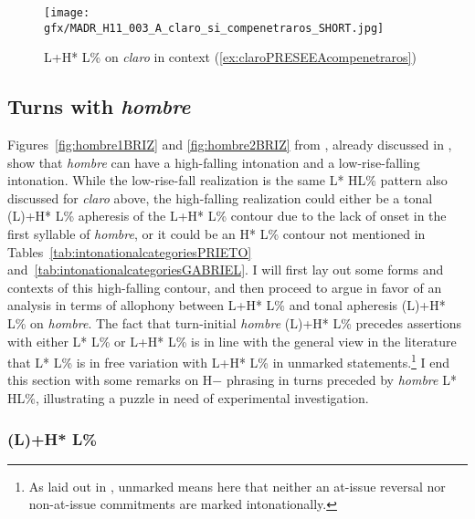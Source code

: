 \begin{figure}
	\texttt{[image: gfx/MADR\_H11\_003\_A\_claro\_si\_compenetraros\_SHORT.jpg]}
	\caption[L+H* L\% on \textit{claro} in context (\ref{ex:claroPRESEEAcompenetraros})]{L+H* L\% on \textit{claro} in context (\ref{ex:claroPRESEEAcompenetraros}) \href{https://osf.io/2q7ht/}{\faVolumeUp} \label{fig:claroPRESEEAcompenetraros}}
\end{figure}


\subsection{Turns with \textit{hombre}}
\label{ch:5.2.2}

Figures~\ref{fig:hombre1BRIZ} and \ref{fig:hombre2BRIZ} from \citet{Briz.2012}, already discussed in , show that \textit{hombre} can have a high-falling intonation and a low-rise-falling intonation. While the low-rise-fall realization is the same L* HL\% pattern also discussed for \textit{claro} above, the high-falling realization could either be a tonal (L)+H* L\% aphe\-re\-sis of the L+H* L\% contour due to the lack of onset in the first syllable of \textit{hombre}, or it could be an H* L\% contour not mentioned in Tables~\ref{tab:intonationalcategoriesPRIETO} and~\ref{tab:intonationalcategoriesGABRIEL}. I will first lay out some forms and contexts of this high-falling contour, and then proceed to argue in favor of an analysis in terms of allophony between L+H* L\% and tonal apheresis (L)+H* L\% on \textit{hombre}. The fact that turn-initial \textit{hombre} (L)+H* L\% precedes assertions with either L* L\% or L+H* L\% is in line with the general view in the literature that L* L\% is in free variation with L+H* L\% in unmarked statements.\footnote{As laid out in , unmarked means here that neither an at-issue reversal nor non-at-issue commitments are marked intonationally.} I end this section with some remarks on H$-$ phrasing in turns preceded by \textit{hombre} L* HL\%, illustrating a puzzle in need of experimental investigation.

\subsubsection{(L)+H* L\%}
\label{ch:5.2.2.1}

